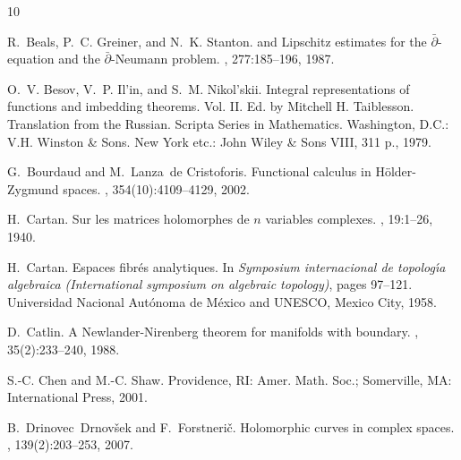 \documentclass[11pt]{amsart}
\numberwithin{equation}{section}
\theoremstyle{definition}
\begin{document}



\begin{thebibliography}{10}

R.~Beals, P.~C. Greiner, and N.~K. Stanton.
 and {Lipschitz} estimates for the
  {{\({\bar\partial}\)}}-equation and the {{\({\bar\partial}\)}}-{Neumann}
  problem.
, 277:185--196, 1987.

O.~V. Besov, V.~P. Il'in, and S.~M. Nikol'skii.
\newblock Integral representations of functions and imbedding theorems. {Vol}.
  {II}. {Ed}. by {Mitchell} {H}. {Taiblesson}. {Translation} from the
  {Russian}.
\newblock Scripta {Series} in {Mathematics}. {Washington}, {D}.{C}.: {V}.{H}.
  {Winston} \& {Sons}. {New} {York} etc.: {John} {Wiley} \& {Sons} {VIII}, 311
  p., 1979. 
  
G.~Bourdaud and M.~Lanza~de Cristoforis.
\newblock Functional calculus in {H{\"o}lder}-{Zygmund} spaces.
, 354(10):4109--4129, 2002.

H.~Cartan.
\newblock Sur les matrices holomorphes de {$n$} variables complexes.
, 19:1--26, 1940.

H.~Cartan.
\newblock Espaces fibr\'es analytiques.
\newblock In {\em Symposium internacional de topolog\'\i a algebraica
  ({I}nternational symposium on algebraic topology)}, pages 97--121.
  Universidad Nacional Aut\'onoma de M\'exico and UNESCO, Mexico City, 1958.

D.~Catlin.
\newblock A {Newlander}-{Nirenberg} theorem for manifolds with boundary.
, 35(2):233--240, 1988.

S.-C. {Chen} and M.-C. {Shaw}.
\newblock Providence, RI: Amer. Math. Soc.; Somerville, MA: International
  Press, 2001.

B.~Drinovec~Drnov{\v{s}}ek and F.~Forstneri\v{c}.
\newblock Holomorphic curves in complex spaces.
, 139(2):203--253, 2007.


\end{thebibliography}
\end{document}
